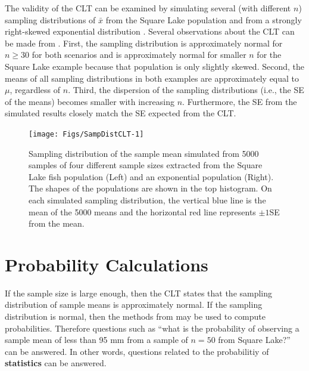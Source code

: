 \documentclass[10pt,openany]{book}\usepackage[]{graphicx}\usepackage[]{color}
\newenvironment{knitrout}{}{} %
\begin{document}
The validity of the CLT can be examined by simulating several (with different $n$) sampling distributions of $\bar{x}$ from the Square Lake population and from a strongly right-skewed exponential distribution . Several observations about the CLT can be made from . First, the sampling distribution is approximately normal for $n\geq30$ for both scenarios and is approximately normal for smaller $n$ for the Square Lake example because that population is only slightly skewed. Second, the means of all sampling distributions in both examples are approximately equal to $\mu$, regardless of $n$. Third, the dispersion of the sampling distributions (i.e., the SE of the means) becomes smaller with increasing $n$. Furthermore, the SE from the simulated results closely match the SE expected from the CLT.

\begin{knitrout}
\color{fgcolor}\begin{figure}[hbtp]

{\centering \texttt{[image: Figs/SampDistCLT-1]} 

}

\caption[Sampling distribution of sample means from Square Lake and exponential populations.]{Sampling distribution of the sample mean simulated from 5000 samples of four different sample sizes extracted from the Square Lake fish population (Left) and an exponential population (Right). The shapes of the populations are shown in the top histogram. On each simulated sampling distribution, the vertical blue line is the mean of the 5000 means and the horizontal red line represents $\pm1$SE from the mean.}\label{fig:SampDistCLT}
\end{figure}


\end{knitrout}


\section{Probability Calculations} \label{sect:sdprob}
If the sample size is large enough, then the CLT states that the sampling distribution of sample means is approximately normal. If the sampling distribution is normal, then the methods from  may be used to compute probabilities. Therefore questions such as ``what is the probability of observing a sample mean of less than 95 mm from a sample of $n=50$ from Square Lake?'' can be answered. In other words, questions related to the probabilitiy of \textbf{statistics} can be answered.
\end{document}
